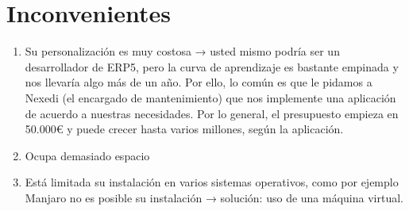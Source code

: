 \section{Inconvenientes}
\begin{enumerate}
	\item Su personalización es muy costosa → usted mismo podría ser un desarrollador de ERP5, pero la curva de aprendizaje es bastante empinada y nos llevaría algo más de un año. Por ello, lo común es que le pidamos a Nexedi (el encargado de mantenimiento) que nos implemente una aplicación de acuerdo a nuestras necesidades. Por lo general, el presupuesto empieza en 50.000€ y puede crecer hasta varios millones, según la aplicación.
	\item Ocupa demasiado espacio
	\item Está limitada su instalación en varios sistemas operativos, como por ejemplo Manjaro no es posible su instalación → solución: uso de una máquina virtual.
\end{enumerate}